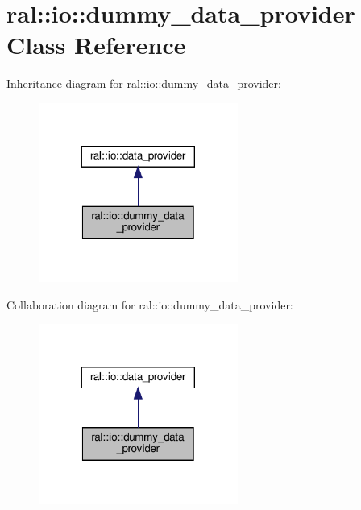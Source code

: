 \hypertarget{classral_1_1io_1_1dummy__data__provider}{}\section{ral\+:\+:io\+:\+:dummy\+\_\+data\+\_\+provider Class Reference}
\label{classral_1_1io_1_1dummy__data__provider}


Inheritance diagram for ral\+:\+:io\+:\+:dummy\+\_\+data\+\_\+provider\+:\nopagebreak
\begin{figure}[H]
\begin{center}
\leavevmode
\includegraphics[width=185pt]{classral_1_1io_1_1dummy__data__provider__inherit__graph}
\end{center}
\end{figure}


Collaboration diagram for ral\+:\+:io\+:\+:dummy\+\_\+data\+\_\+provider\+:\nopagebreak
\begin{figure}[H]
\begin{center}
\leavevmode
\includegraphics[width=185pt]{classral_1_1io_1_1dummy__data__provider__coll__graph}
\end{center}
\end{figure}
